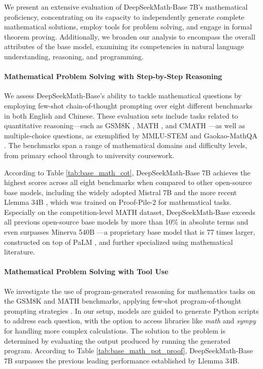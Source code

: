 \begin{itemize}[topsep=0pt]
We present an extensive evaluation of DeepSeekMath-Base 7B’s mathematical proficiency, concentrating on its capacity to independently generate complete mathematical solutions, employ tools for problem solving, and engage in formal theorem proving. Additionally, we broaden our analysis to encompass the overall attributes of the base model, examining its competencies in natural language understanding, reasoning, and programming.

\paragraph{Mathematical Problem Solving with Step-by-Step Reasoning}

We assess DeepSeekMath-Base's ability to tackle mathematical questions by employing few-shot chain-of-thought prompting \citep{cot} over eight different benchmarks in both English and Chinese. These evaluation sets include tasks related to quantitative reasoning—such as GSM8K \citep{gsm8k}, MATH \citep{MATH}, and CMATH \citep{wei2023cmath}—as well as multiple-choice questions, as exemplified by MMLU-STEM \citep{mmlu} and Gaokao-MathQA \citep{agieval}. The benchmarks span a range of mathematical domains and difficulty levels, from primary school through to university coursework.

According to Table \ref{tab:base_math_cot}, DeepSeekMath-Base 7B achieves the highest scores across all eight benchmarks when compared to other open-source base models, including the widely adopted Mistral 7B \citep{mistral} and the more recent Llemma 34B \citep{llemma}, which was trained on Proof-Pile-2 \citep{llemma} for mathematical tasks. Especially on the competition-level MATH dataset, DeepSeekMath-Base exceeds all previous open-source base models by more than 10\% in absolute terms and even surpasses Minerva 540B \citep{minerva}—a proprietary base model that is 77 times larger, constructed on top of PaLM \citep{palm}, and further specialized using mathematical literature.

\paragraph{Mathematical Problem Solving with Tool Use} We investigate the use of program-generated reasoning for mathematics tasks on the GSM8K and MATH benchmarks, applying few-shot program-of-thought prompting strategies \citep{pot,pal}. In our setup, models are guided to generate Python scripts to address each question, with the option to access libraries like \textit{math} and \textit{sympy} for handling more complex calculations. The solution to the problem is determined by evaluating the output produced by running the generated program. According to Table \ref{tab:base_math_pot_proof}, DeepSeekMath-Base 7B surpasses the previous leading performance established by Llemma 34B.


\end{itemize}
